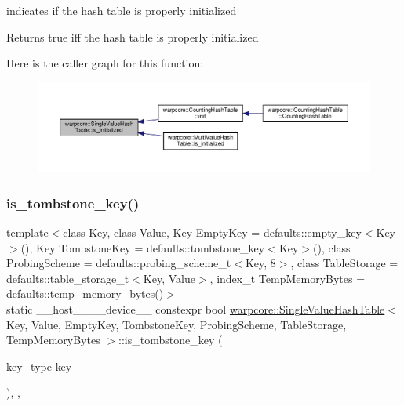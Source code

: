 indicates if the hash table is properly initialized 

\begin{DoxyReturn}{Returns}
{\ttfamily true} iff the hash table is properly initialized 
\end{DoxyReturn}
Here is the caller graph for this function\+:
\nopagebreak
\begin{figure}[H]
\begin{center}
\leavevmode
\includegraphics[width=350pt]{classwarpcore_1_1SingleValueHashTable_ae366b3fd0d7edbac68a939fe580df9a4_icgraph}
\end{center}
\end{figure}
\mbox{\label{classwarpcore_1_1SingleValueHashTable_ae780824551ec26fb0db7e07018061099}} 
\subsubsection{\texorpdfstring{is\+\_\+tombstone\+\_\+key()}{is\_tombstone\_key()}}
{\footnotesize\ttfamily template$<$class Key, class Value, Key Empty\+Key = defaults\+::empty\+\_\+key$<$\+Key$>$(), Key Tombstone\+Key = defaults\+::tombstone\+\_\+key$<$\+Key$>$(), class Probing\+Scheme = defaults\+::probing\+\_\+scheme\+\_\+t$<$\+Key, 8$>$, class Table\+Storage = defaults\+::table\+\_\+storage\+\_\+t$<$\+Key, Value$>$, index\+\_\+t Temp\+Memory\+Bytes = defaults\+::temp\+\_\+memory\+\_\+bytes()$>$ \\
static \+\_\+\+\_\+host\+\_\+\+\_\+\+\_\+\+\_\+device\+\_\+\+\_\+ constexpr bool \hyperlink{classwarpcore_1_1SingleValueHashTable}{warpcore\+::\+Single\+Value\+Hash\+Table}$<$ Key, Value, Empty\+Key, Tombstone\+Key, Probing\+Scheme, Table\+Storage, Temp\+Memory\+Bytes $>$\+::is\+\_\+tombstone\+\_\+key (\begin{DoxyParamCaption}\item[{key\+\_\+type}]{key }\end{DoxyParamCaption})\hspace{0.3cm}{\ttfamily [inline]}, {\ttfamily [static]}, {\ttfamily [noexcept]}}



